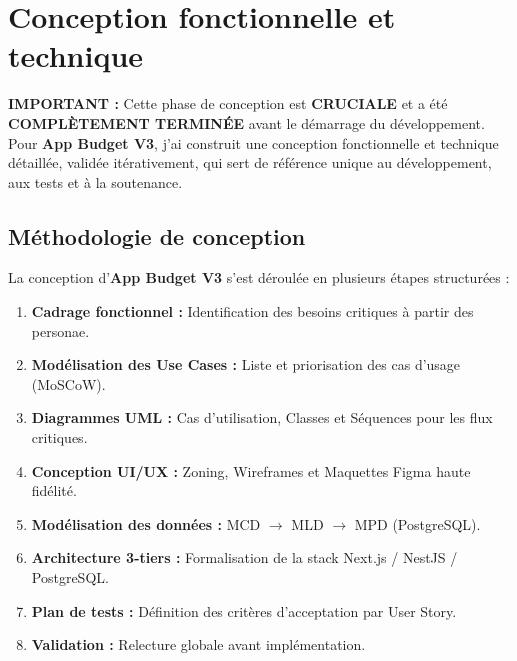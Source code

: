 \chapter{Conception fonctionnelle et technique}

\textbf{IMPORTANT :} Cette phase de conception est \textbf{CRUCIALE} et a été \textbf{COMPLÈTEMENT TERMINÉE} avant le démarrage du développement. Pour \textbf{App Budget V3}, j'ai construit une conception fonctionnelle et technique détaillée, validée itérativement, qui sert de référence unique au développement, aux tests et à la soutenance.

\section{Méthodologie de conception}

La conception d'\textbf{App Budget V3} s'est déroulée en plusieurs étapes structurées :

\begin{enumerate}
    \item \textbf{Cadrage fonctionnel :} Identification des besoins critiques à partir des personae.
    \item \textbf{Modélisation des Use Cases :} Liste et priorisation des cas d'usage (MoSCoW).
    \item \textbf{Diagrammes UML :} Cas d'utilisation, Classes et Séquences pour les flux critiques.
    \item \textbf{Conception UI/UX :} Zoning, Wireframes et Maquettes Figma haute fidélité.
    \item \textbf{Modélisation des données :} MCD $\rightarrow$ MLD $\rightarrow$ MPD (PostgreSQL).
    \item \textbf{Architecture 3-tiers :} Formalisation de la stack Next.js / NestJS / PostgreSQL.
    \item \textbf{Plan de tests :} Définition des critères d'acceptation par User Story.
    \item \textbf{Validation :} Relecture globale avant implémentation.
\end{enumerate}

